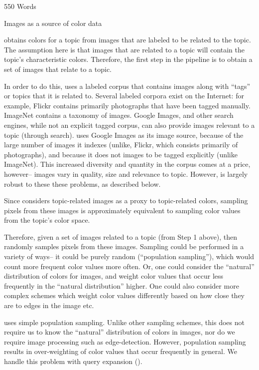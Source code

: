 550 Words

Images as a source of color data

\system obtains colors for a topic from images that are labeled to be related to the topic. The assumption here is that images that are related to a topic will contain the topic's characteristic colors. Therefore, the first step in the \system pipeline is to obtain a set of images that relate to a topic.

In order to do this, \system uses a labeled corpus that contains images along with ``tags'' or topics that it is related to. Several labeled corpora exist on the Internet: for example, Flickr contains primarily photographs that have been tagged manually. ImageNet contains a taxonomy of images.  Google Images, and other search engines, while not an explicit tagged corpus, can also provide images relevant to a topic (through search). \system uses Google Images as its image source, because of the large number of images it indexes (unlike, Flickr, which consists primarily of photographs), and because it does not images to be tagged explicitly (unlike ImageNet). This increased diversity and quantity in the corpus comes at a price, however-- images vary in quality, size and relevance to topic. However, \system is largely robust to these these problems, as described below.

Since \system considers topic-related images as a proxy to topic-related colors, sampling pixels from these images is approximately equivalent to sampling color values from the topic's color space. 

Therefore, given a set of images related to a topic (from Step 1 above), \system then randomly samples pixels from these images. Sampling could be performed in a variety of ways-- it could be purely random (``population sampling''), which would count more frequent color values more often. Or, one could consider the ``natural'' distribution of colors for images, and weight color values that occur less frequently in the ``natural distribution'' higher. One could also consider more complex schemes which weight color values differently based on how close they are to edges in the image etc.

\system uses simple population sampling. Unlike other sampling schemes, this does not require us to know the ``natural'' distribution of colors in images, nor do we require image processing such as edge-detection. However, population sampling results in over-weighting of color values that occur frequently in general. We handle this problem with query expansion ().

